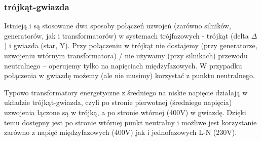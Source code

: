 \begin{center} \begin{adjustbox}{scale=0.75}  \end{adjustbox} \end{center}


\subsubsection{trójkąt-gwiazda}

Istnieją i są stosowane dwa sposoby połączeń uzwojeń (zarówno silników, generatorów, jak i transformatorów) w systemach trójfazowych - trójkąt (delta $\Delta$) i gwiazda (star, Y).
Przy połączeniu w trójkąt nie dostajemy (przy generatorze, uzwojeniu wtórnym transformatora) / nie używamy (przy silnikach) przewodu neutralnego – operujemy tylko na napięciach międzyfazowych.
W przypadku połączenia w gwiazdę możemy (ale nie musimy) korzystać z punktu neutralnego.

Typowo transformatory energetyczne z średniego na niskie napięcie działają w układzie trójkąt-gwiazda, czyli po stronie pierwotnej (średniego napięcia) uzwojenia łączone są w trójką, a po stronie wtórnej (400V) w gwiazdę.
Dzięki temu dostępny jest po stronie wtórnej punkt neutralny i możliwe jest korzystanie zarówno z napięć międzyfazowych (400V) jak i jednofazowych L-N (230V).


